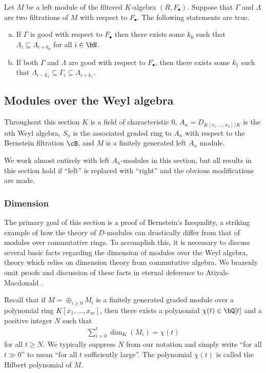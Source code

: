 \begin{prop}\label{prop:compare-filtrations}
	Let $M$ be a left module of the filtered $K$-algebra $(R,F_\bullet)$. Suppose that $\Gamma$ and $\Lambda$ are two filtrations of $M$ with respect to $F_\bullet$. The following statements are true.
	\begin{enumerate}[(a)]
		\item If $\Gamma$ is good with respect to $F_\bullet$ then there exists some $k_0$ such that $\Lambda_i \subseteq \Lambda_{i+k_0}$ for all $i\in \bN$.
		\item If both $\Gamma$ and $\Lambda$ are good with respect to $F_\bullet$, then there exists some $k_1$ such that $\Lambda_{i-k_1}\subseteq \Gamma_i \subseteq \Lambda_{i+k_1}$.
	\end{enumerate}
\end{prop}
\begin{prf}
	\cite[Proposition 8.3.2]{d-mod-primer}
\end{prf}
\subsection{Modules over the Weyl algebra}
Throughout this section $K$ is a field of characteristic $0$, $A_n = D_{K[x_1,...,x_n]/K}$ is the $n$th Weyl algebra, $S_n$ is the associated graded ring to $A_n$ with respect to the Bernstein filtration $\cB$, and $M$ is a finitely generated left $A_n$ module.

We work almost entirely with left $A_n$-modules in this section, but all results in this section hold if ``left'' is replaced with ``right'' and the obvious modifications are made.

\subsubsection{Dimension}
The primary goal of this section is a proof of Bernstein's Inequality, a striking example of how the theory of $D$-modules can drastically differ from that of modules over commutative rings. To accomplish this, it is necessary to discuss several basic facts regarding the dimension of modules over the Weyl algebra, theory which relies on dimension theory from commutative algebra. We brazenly omit proofs and discussion of these facts in eternal deference to Atiyah-Macdonald \cite{am}.

Recall that if $M = \oplus_{i \geq 0} M_i$ is a finitely generated graded module over a polynomial ring $K[x_1,...,x_m]$, then there exists a polynomial $\chi(t) \in \bQ[t]$ and a positive integer $N$ such that 
\begin{align*}
	\sum_{i = 0}^t \dim_K(M_i) = \chi(t)
\end{align*}
for all $t \geq N$. We typically suppress $N$ from our notation and simply write ``for all $t \gg 0$'' to mean ``for all $t$ sufficiently large''. The polynomial $\chi(t)$ is called the Hilbert polynomial of $M$.

